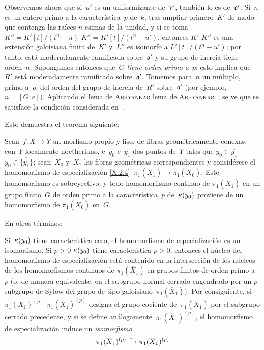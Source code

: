 Observemos ahora que si~$u'$ es un uniformizante de~$V'$, también lo es
de~$\mathfrak{o'}$. Si~$n$ es un entero primo a la característica~$p$ de~$k$,
{}
{tras ampliar primero~$K'$ de modo que contenga las raíces $n$-esimas de la
unidad,}
y si se toma
{$K''=K'[t]/(t^n-u)$}
{$K''=K'[t]/(t^n-u')$},
entonces
{$K'$}
{$K''$}
es una extensión galoisiana finita de~$K'$ y~$L''$ es isomorfo a
$L'[t]/(t^n-u')$; por tanto, está moderadamente ramificada sobre~$\mathfrak{o'}$ y
su grupo de inercia tiene orden~$n$. Supongamos entonces que~$G$ \emph{tiene
orden primo a~$p$}; esto implica que~$R'$ está moderadamente ramificada
sobre~$\mathfrak{o'}$. Tomemos para~$n$ un múltiplo, primo a~$p$, del orden del
grupo de inercia de~$R'$ sobre~$\mathfrak{o'}$ (por ejemplo,
$n=[G\colon e]$). Aplicando el
{lema de \textsc{Abhyankar}}
{lema de \textsc{Abhyankar}}~,
se ve que se satisface la condición considerada en~.

Esto demuestra el teorema siguiente:

\begin{theoreme}
\label{X.3.8}
Sean~$f\colon X\to Y$ un morfismo propio y liso, de fibras
%
geométricamente conexas, con~$Y$ localmente noetheriano, e~$y_0$ e~$y_1$ dos
puntos de~$Y$ tales que
{$y_0\in\overline{y_1}$}
{$y_0\in\overline{\{y_1\}}$};
sean~$\overline{X}_0$ y~$\overline{X}_1$ las fibras geométricas
correspondientes y considérese el homomorfismo de especialización
\eqref{X.2.4}~$\pi_1(\overline X_1)\to\pi_1(\overline X_0)$. Este
homomorfismo es sobreyectivo, y todo homomorfismo continuo de
$\pi_1(\overline X_1)$ en un grupo finito~$G$ de orden primo a la
característica~$p$ de~$\kappa(y_0)$ proviene de un homomorfismo de
$\pi_1(\overline{X}_0)$ en~$G$.
\end{theoreme}

En otros términos:

\begin{corollaire}
\label{X.3.9}
Si~$\kappa(y_0)$ tiene característica cero, el homomorfismo de especialización
es un isomorfismo. Si
{$p>0$}
{$\kappa(y_0)$ tiene característica $p>0$},
entonces el núcleo del homomorfismo de especialización está contenido en la
intersección de los núcleos de los homomorfismos continuos de
$\pi_1(\overline X_1)$ en grupos finitos de orden primo a~$p$ (o, de manera
equivalente, en el subgrupo normal cerrado engendrado por un $p$-subgrupo de
Sylow del grupo de tipo galoisiano~$\pi_1(\overline X_1)$). Por consiguiente,
si
{$\pi_1(X_1)^{(p)}$}
{$\pi_1(\overline X_1)^{(p)}$}
designa el grupo cociente de~$\pi_1(\overline X_1)$ por el subgrupo cerrado
precedente, y si se define análogamente~$\pi_1(\overline X_0)^{(p)}$, el
homomorfismo de especialización induce un \emph{isomorfismo}
$$
\pi_1(\overline X_1)^{(p)}\xrightarrow{\sim} \pi_1(\overline X_0)^{(p)}
$$
\end{corollaire}

